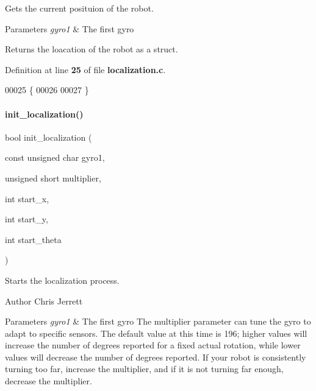 Gets the current posituion of the robot. 


\begin{DoxyParams}{Parameters}
{\em gyro1} & The first gyro \\
\hline
\end{DoxyParams}
\begin{DoxyReturn}{Returns}
the loacation of the robot as a struct. 
\end{DoxyReturn}


Definition at line \textbf{ 25} of file \textbf{ localization.\+c}.


\begin{DoxyCode}
00025                                \{
00026 
00027 \}
\end{DoxyCode}
\mbox{\label{localization_8h_afdd0147de6aa15957e9a125f9cd20578}} 
\paragraph{init\+\_\+localization()}
{\footnotesize\ttfamily bool init\+\_\+localization (\begin{DoxyParamCaption}\item[{const unsigned char}]{gyro1,  }\item[{unsigned short}]{multiplier,  }\item[{int}]{start\+\_\+x,  }\item[{int}]{start\+\_\+y,  }\item[{int}]{start\+\_\+theta }\end{DoxyParamCaption})}



Starts the localization process. 

\begin{DoxyAuthor}{Author}
Chris Jerrett
\end{DoxyAuthor}

\begin{DoxyParams}{Parameters}
{\em gyro1} & The first gyro  The multiplier parameter can tune the gyro to adapt to specific sensors. The default value at this time is 196; higher values will increase the number of degrees reported for a fixed actual rotation, while lower values will decrease the number of degrees reported. If your robot is consistently turning too far, increase the multiplier, and if it is not turning far enough, decrease the multiplier. \\
\hline
\end{DoxyParams}


